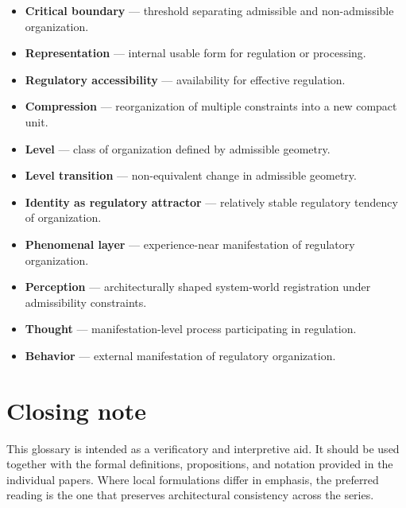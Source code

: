 \documentclass[11pt,a4paper]{article}
\begin{document}
\begin{itemize}[leftmargin=2em]
		\item \textbf{Critical boundary} --- threshold separating admissible and non-admissible organization.
		\item \textbf{Representation} --- internal usable form for regulation or processing.
		\item \textbf{Regulatory accessibility} --- availability for effective regulation.
		\item \textbf{Compression} --- reorganization of multiple constraints into a new compact unit.
		\item \textbf{Level} --- class of organization defined by admissible geometry.
		\item \textbf{Level transition} --- non-equivalent change in admissible geometry.
		\item \textbf{Identity as regulatory attractor} --- relatively stable regulatory tendency of organization.
		\item \textbf{Phenomenal layer} --- experience-near manifestation of regulatory organization.
		\item \textbf{Perception} --- architecturally shaped system-world registration under admissibility constraints.
		\item \textbf{Thought} --- manifestation-level process participating in regulation.
		\item \textbf{Behavior} --- external manifestation of regulatory organization.
	\end{itemize}
	
	\section{Closing note}
	
	This glossary is intended as a verificatory and interpretive aid. It should be used together with the formal definitions, propositions, and notation provided in the individual papers. Where local formulations differ in emphasis, the preferred reading is the one that preserves architectural consistency across the series.
	
\end{document}
